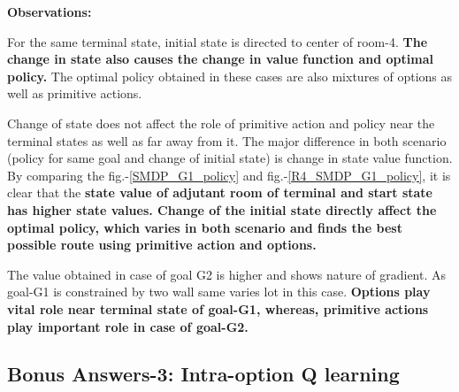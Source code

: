 \documentclass[preprint,12pt]{elsarticle}
\begin{document}
\textbf{Observations:}

For the same terminal state, initial state is directed to center of room-4. \textbf{The change in state also causes the change in value function and optimal policy.} The optimal policy obtained in these cases are also mixtures of options as well as primitive actions. 

Change of state does not affect the role of primitive action and policy near the terminal states as well as far away from it. The major difference in both scenario (policy for same goal and change of initial state) is change in state value function. By comparing the fig.-\ref{SMDP_G1_policy} and fig.-\ref{R4_SMDP_G1_policy}, it is clear that the \textbf{state value of adjutant room of terminal and start state has higher state values. Change of the initial state directly affect the optimal policy, which varies in both scenario and finds the best possible route using primitive action and options.}

 The value obtained in case of goal G2 is higher and shows nature of gradient. As goal-G1 is constrained by two wall same varies lot in this case. \textbf{Options play vital role near terminal state of goal-G1, whereas, primitive actions play important role in case of goal-G2.}
 
 \newpage

\subsection{Bonus Answers-3: Intra-option Q learning} 
\end{document}
